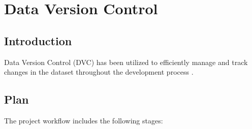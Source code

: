 %
%

\chapter{Data Version Control}

	
\section{Introduction}

Data Version Control (DVC) has been utilized to efficiently manage and track changes in the dataset throughout the development process \cite{Iterative:2020}.
	
\section{Plan}

The project workflow includes the following stages:

